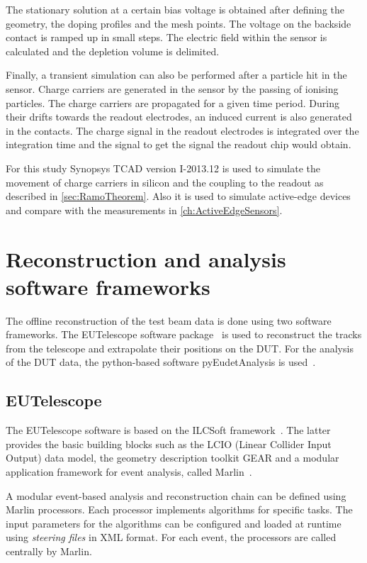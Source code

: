 The stationary solution at a certain bias voltage is obtained after
defining the geometry, the doping profiles and the mesh points. The
voltage on the backside contact is ramped up in small steps. The
electric field within the sensor is calculated and the depletion
volume is delimited.

Finally, a transient simulation can also be performed after a particle
hit in the sensor. Charge carriers are generated in the sensor by the
passing of ionising particles. The charge carriers are propagated for
a given time period. During their drifts towards the readout
electrodes, an induced current is also generated in the contacts. The
charge signal in the readout electrodes is integrated over the
integration time and the signal to get the signal the readout chip
would obtain.

For this study Synopsys TCAD version I-2013.12 is used to simulate the
movement of charge carriers in silicon and the coupling to the readout
as described in \cref{sec:RamoTheorem}. Also it is used to simulate
active-edge devices and compare with the measurements in
\cref{ch:ActiveEdgeSensors}.

\section{Reconstruction and analysis software frameworks}
\label{sec:recoSoft}

The offline reconstruction of the test beam data is done using two
software frameworks. The EUTelescope software
package~\cite{Rubinskiy,EutelescopeWebsite} is used to reconstruct the
tracks from the telescope and extrapolate their positions on the
DUT. For the analysis of the DUT data, the python-based software
pyEudetAnalysis is used~\cite{pyeudet}.

\subsection{EUTelescope}
\label{sec:EUTelescope}
The EUTelescope software is based on the ILCSoft
framework~\cite{Aplin:2009zz}. The latter provides the basic building
blocks such as the LCIO (Linear Collider Input Output) data model, the
geometry description toolkit GEAR and a modular application framework
for event analysis, called Marlin~\cite{Gaede:2006pj}.

A modular event-based analysis and reconstruction chain can be defined
using Marlin processors. Each processor implements algorithms for
specific tasks. The input parameters for the algorithms can be
configured and loaded at runtime using \textit{steering files} in XML
format. For each event, the processors are called centrally by Marlin.

